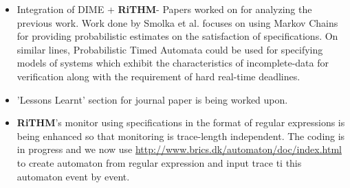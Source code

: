 \documentclass[]{article}
\newcommand{\rithm}{\textbf{RiTHM}\space}
\begin{document}
\begin{itemize}
	\item Integration of DIME + \rithm - Papers worked on for analyzing the previous work. Work done by Smolka et al. focuses on using Markov Chains for providing probabilistic estimates on the satisfaction of specifications. On similar lines, Probabilistic Timed Automata could be used for specifying 
	models of systems which exhibit the characteristics of incomplete-data for verification along with the requirement of hard real-time deadlines.
	\item 'Lessons Learnt' section for journal paper is being worked upon.
	\item \rithm's monitor using specifications in the format of regular expressions is being enhanced so that monitoring is trace-length independent. The coding is in progress and we now use \url{http://www.brics.dk/automaton/doc/index.html} to create automaton from regular expression and input trace ti this automaton event by event. 
	
	
	
\end{itemize}
    
\end{document}
